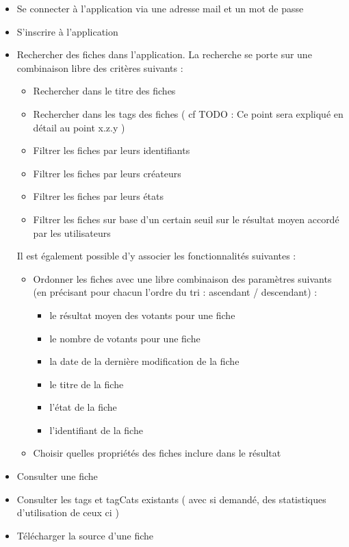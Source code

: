 \begin{itemize}
    \item Se connecter à l'application via une adresse mail et un mot de passe
    \item S'inscrire à l'application
    \item Rechercher des \glspl{fiche} dans l'application. La recherche se porte sur une combinaison libre des critères suivants : 
    \begin{itemize}
        \item Rechercher dans le titre des \glspl{fiche}
        \item Rechercher dans les \glspl{tag} des \glspl{fiche} ( cf TODO : Ce point sera expliqué en détail au point x.z.y )
        \item Filtrer les \glspl{fiche} par leurs identifiants
        \item Filtrer les \glspl{fiche} par leurs créateurs
        \item Filtrer les \glspl{fiche} par leurs états
        \item Filtrer les \glspl{fiche} sur base d'un certain seuil sur le résultat moyen accordé par les utilisateurs
    \end{itemize}
    Il est également possible d'y associer les fonctionnalités suivantes :
    \begin{itemize}
        \item Ordonner les \glspl{fiche} avec une libre combinaison des paramètres suivants (en précisant pour chacun l'ordre du tri : ascendant / descendant) :
        \begin{itemize}
            \item le résultat moyen des votants pour une \gls{fiche}
            \item le nombre de votants pour une \gls{fiche}
            \item la date de la dernière modification de la \gls{fiche}
            \item le titre de la \gls{fiche}
            \item l'état de la \gls{fiche}
            \item l'identifiant de la \gls{fiche}
        \end{itemize}
        \item Choisir quelles propriétés des \glspl{fiche} inclure dans le résultat
    \end{itemize}
    \item Consulter une \gls{fiche}
    \item Consulter les \glspl{tag} et \glspl{tagCat} existants ( avec si demandé, des statistiques d'utilisation de ceux ci )
    \item Télécharger la source d'une \gls{fiche} 
\end{itemize}

